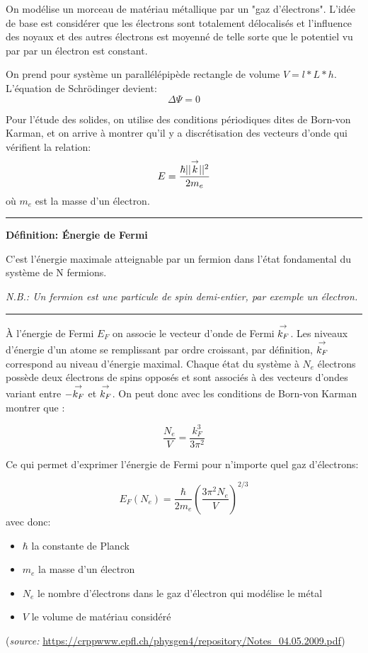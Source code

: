 \documentclass{article}
\begin{document}
On modélise un morceau de matériau métallique par un "gaz d'électrons". L’idée de base est considérer que les électrons sont totalement délocalisés et l’influence des noyaux et des autres électrons est moyenné de telle sorte que le potentiel vu par par un électron est constant. 

On prend pour système un parallélépipède rectangle de volume $V = l*L*h$.
L'équation de Schrödinger devient:
$$\Delta \Psi = 0$$

Pour l'étude des solides, on utilise des conditions périodiques dites de Born-von Karman, et on arrive à montrer qu'il y a discrétisation des vecteurs d'onde qui vérifient la relation:
$$E = \frac{\hbar ||\overset{\to}{k}||^2}{2m_e}$$
où $m_e$ est la masse d'un électron.

\rule{\textwidth}{0.4pt}

\begin{center}
\textbf{Définition: Énergie de Fermi}
    
    C’est l’énergie maximale atteignable par un fermion dans l’état fondamental du système de N fermions.

\emph{N.B.: Un fermion est une particule de spin demi-entier, par exemple un électron.}    
\end{center}

\rule{\textwidth}{0.4pt}

À l'énergie de Fermi $E_F$ on associe le vecteur d'onde de Fermi $\overset{\to}{k_F}$. Les niveaux d'énergie d'un atome se remplissant par ordre croissant, par définition, $\overset{\to}{k_F}$ correspond au niveau d'énergie maximal. Chaque état du système à $N_e$ électrons possède deux électrons de spins opposés et sont associés à des vecteurs d'ondes variant entre $-\overset{\to}{k_F}$ et $\overset{\to}{k_F}$. On peut donc avec les conditions de Born-von Karman montrer que :

$$\frac{N_e}{V} = \frac{k_F^3}{3\pi^2}$$

Ce qui permet d'exprimer l'énergie de Fermi pour n'importe quel gaz d'électrons:


    $$E_F(N_e) = \frac{\hbar}{2m_e} \left(\frac{3\pi^2N_e}{V}\right)^{2/3}$$
avec donc:
    \begin{itemize}
        \item $\hbar$ la constante de Planck
        \item $m_e$ la masse d'un électron
        \item $N_e$ le nombre d'électrons dans le gaz d'électron qui modélise le métal
        \item $V$ le volume de matériau considéré
    \end{itemize}
(\emph{source: }\url{https://crppwww.epfl.ch/physgen4/repository/Notes_04.05.2009.pdf})
\end{document}
